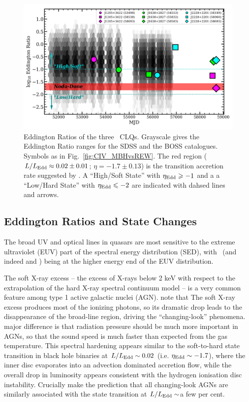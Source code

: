\documentclass[fleqn,usenatbib]{mnras}
\begin{document}
\begin{figure}
  \centering
  \includegraphics[width=14.5cm, trim=0.2cm 0.2cm 0.0cm 0.2cm, clip]
  {figures/MJD_vs_Eddington_20191202.png}
  \vspace{-12pt}
  \caption[]{Eddington Ratios of the three \civ\ CLQs.
    Grayscale gives the Eddington Ratio ranges for the SDSS
    \citep[from ][]{Shen2011} and the BOSS \citep[from ][]{Kozlowski2017} 
    catalogues.
    Symbols as in Fig.~\ref{fig:CIV_MBHvsREW}.
    The red region ($L / L_{\rm Edd} \approx 0.02\pm0.01$;  $\eta =-1.7\pm0.13$) is
    the transition accretion rate suggested by \citet{NodaDone2018}.
    A ``High/Soft State'' with $\eta_{\rm Edd} \geq -1$ and a
    a ``Low/Hard State'' with $\eta_{\rm Edd} \leq -2$ are indicated 
    with dahsed lines and arrows. 
  }
  \label{fig:Eddington_ratios}
\end{figure}
\subsection{Eddington Ratios and State Changes} 
The broad UV and optical lines in quasars are most sensitive to the
extreme ultraviolet (EUV) part of the spectral energy distribution
(SED), with \civ\ (and indeed \heii and \nv) being at the higher
energy end of the EUV distribution.

The soft X-ray excess -- the excess of X-rays below 2 keV with respect
to the extrapolation of the hard X-ray spectral continuum model -- is
a very common feature among type 1 active galactic nuclei (AGN). 
\citet{NodaDone2018} note that
The soft X-ray excess produces most of the ionizing photons, so its
dramatic drop leads to the disappearance of the broad-line region,
driving the ``changing-look'' phenomena.  major difference is that
radiation pressure should be much more important in AGNs, so that the
sound speed is much faster than expected from the gas temperature.
This spectral hardening appears similar to the soft-to-hard state
transition in black hole binaries at $L / L_{\rm Edd} \sim 0.02$
(i.e. $\eta_{\rm Edd} \sim -1.7$), where the inner disc evaporates into
an advection dominated accretion flow, while the overall drop in
luminosity appears consistent with the hydrogen ionisation disc
instability.  Crucially \citet{NodaDone2018} make the prediction that
all changing-look AGNs are similarly associated with the state
transition at $L / L_{\rm Edd} \sim$a few per cent.
\end{document}
